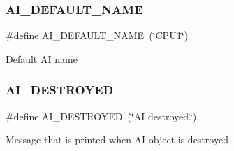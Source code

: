 \subsubsection{\texorpdfstring{A\+I\+\_\+\+D\+E\+F\+A\+U\+L\+T\+\_\+\+N\+A\+ME}{AI\_DEFAULT\_NAME}}
{\footnotesize\ttfamily \#define A\+I\+\_\+\+D\+E\+F\+A\+U\+L\+T\+\_\+\+N\+A\+ME~(\char`\"{}C\+P\+U1\char`\"{})}

Default AI name \mbox{\label{_i_a_8hh_a7582ad43aa5cfa7ac763c4fcc5278f57}} 
\subsubsection{\texorpdfstring{A\+I\+\_\+\+D\+E\+S\+T\+R\+O\+Y\+ED}{AI\_DESTROYED}}
{\footnotesize\ttfamily \#define A\+I\+\_\+\+D\+E\+S\+T\+R\+O\+Y\+ED~(\char`\"{}AI destroyed.\char`\"{})}

Message that is printed when AI object is destroyed 
